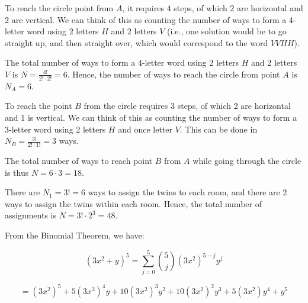 \documentclass[a4paper,12pt]{article}
\begin{document}
To reach the circle point from $A$, it requires 4 steps, of which 2 are horizontal and 2 are vertical. We can think of this as counting the number of ways to form a 4-letter word using 2 letters $H$ and 2 letters $V$ (i.e., one solution would be to go straight up, and then straight over, which would correspond to the word $VVHH$).

The total number of ways to form a 4-letter word using 2 letters $H$ and 2 letters $V$ is $N = \frac{4!}{2! \cdot 2!} = 6$. Hence, the number of ways to reach the circle from point $A$ is $N_A = 6$. 

To reach the point $B$ from the circle requires 3 steps, of which 2 are horizontal and 1 is vertical. We can think of this as counting the number of ways to form a 3-letter word using 2 letters $H$ and once letter $V$. This can be done in $N_B = \frac{3!}{2! \cdot 1!} = 3$ ways. 

The total number of ways to reach point $B$ from $A$ while going through the circle is thus $N = 6 \cdot 3 = 18$.

\pagebreak
{}

\vspace{2mm}
There are $N_1 = 3! = 6$ ways to assign the twins to each room, and there are 2 ways to assign the twins within each room. Hence, the total number of assignments is $N = 3! \cdot 2^3 = 48$.

\vspace{4mm}

From the Binomial Theorem, we have:

\[ (3x^2+ y)^5 = \sum_{j=0}^5 \binom{5}{j} (3x^2)^{5-j}y^j \]

\[ = (3x^2)^5 + 5(3x^2)^4 y +10 (3x^2)^3 y^2 + 10(3x^2)^2 y^3 + 5(3x^2) y^4 + y^5\]
\end{document}
